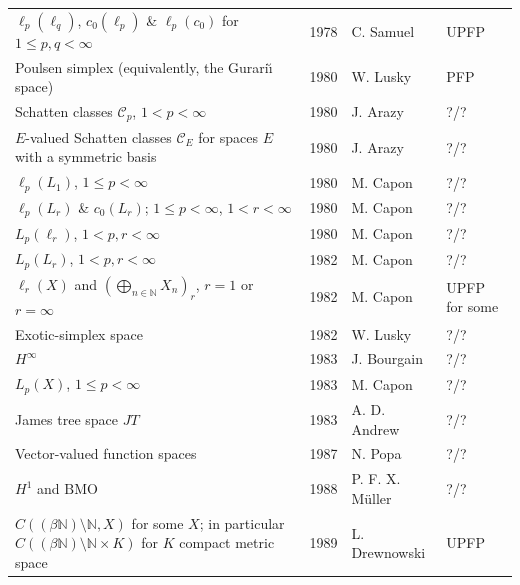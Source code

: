 \documentclass[11pt]{amsart}
\theoremstyle{plain}
\theoremstyle{definition}
\numberwithin{equation}{section}
\newcommand{\N}{\mathbb{N}}
\renewcommand{\leq}{\leqslant}
\begin{document}
\begin{longtable}{@{}L{0.30\textwidth}L{0.08\textwidth}L{0.29\textwidth}L{0.23\textwidth}@{}}
$\ell_p(\ell_q)$, $c_0(\ell_p)$ \& $\ell_p(c_0)$ for $1 \leq p, q <\infty$  & 1978 &
C. Samuel \cite{Samuel1978} & UPFP \\

Poulsen simplex (equivalently, the Gurari\u{\i} space) & 1980 &
W. Lusky \cite{Lusky1980} & PFP \\

Schatten classes $\mathcal{C}_p$, $1 < p <\infty$ & 1980 &
J. Arazy \cite{Arazy1980} & ?/? \\

$E$-valued Schatten classes $\mathcal{C}_E$ for spaces $E$ with a symmetric basis & 1980 &
J. Arazy \cite{Arazy1980Remark} & ?/? \\

$\ell_p(L_1)$, $1 \leq p < \infty$ & 1980 &
M. Capon \cite{Capon1980} & ?/? \\

$\ell_p(L_r)$ \& $c_0(L_r)$; $1 \leq p < \infty$, $1 < r < \infty$ & 1980 &
M. Capon \cite{Capon1980b} & ?/? \\

$L_p(\ell_r)$, $1 < p,r < \infty$ & 1980 &
M. Capon \cite{Capon1980b} & ?/? \\

$L_p(L_r)$, $1 < p,r < \infty$ & 1982 &
M. Capon \cite{Capon1982} & ?/? \\

$\ell_r(X)$ and $\left(\bigoplus_{n \in \N} X_n \right)_r$, $r = 1$ or $r = \infty$ & 1982 &
M. Capon \cite{Capon1982PLMS} & UPFP for some \\

Exotic-simplex space & 1982 &
W. Lusky \cite{Lusky1982} & ?/? \\

$H^\infty$ & 1983 &
J. Bourgain \cite{Bourgain1983} & ?/? \\

$L_p(X)$, $1 \leq p < \infty$ & 1983 &
M. Capon \cite{Capon1983} & ?/? \\

James tree space $JT$ & 1983 &
A. D. Andrew \cite{Andrew1983} & ?/? \\

Vector-valued function spaces & 1987 &
N. Popa \cite{Popa1987} & ?/? \\

$H^1$ and $\mathrm{BMO}$ & 1988 &
P. F. X. M\"uller \cite{Muller1988} & ?/? \\

$C((\beta \N) \setminus \N, X)$ for some $X$; in particular $C((\beta \N) \setminus \N \times K)$ for $K$ compact metric space & 1989 &
L. Drewnowski \cite{Drewnowski1989} & UPFP \\


\end{longtable}
\end{document}
